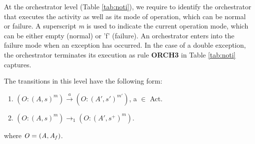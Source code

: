 At the orchestrator level (Table \ref{tab:noti}), we require to identify the orchestrator that executes the activity as well as its mode of operation, which can be normal or failure. A superscript {\it m} is used to indicate the current operation mode, which can be either empty (normal) or 'f' (failure). An orchestrator enters into the failure mode when an exception has occurred. In the case of a double exception, the orchestrator terminates its execution as rule {\bf ORCH3} in Table \ref{tab:noti} captures.
\begin{definition}
The transitions in this level have the following form:

\begin{enumerate}
\item \hspace{0.1cm}$(O:(A,s)^{m})\xrightarrow{a}(O:(A',s')^{m'})$, a $\in$ Act. %
\item \hspace{0.1cm}$(O:(A,s)^{m})\xrightarrow{}_1(O:(A',s^+)^{m})$. %
\end{enumerate}
where ${\it O= (A,A_f)}$.
\vspace{-0.4cm}
\end{definition}
\vspace{0.2cm}
